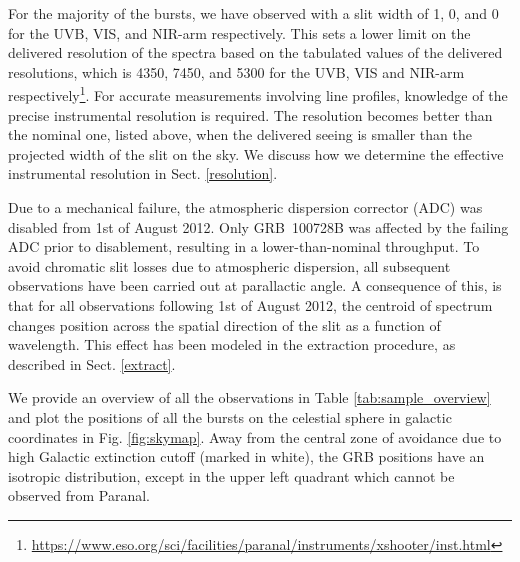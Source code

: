\documentclass{aa}    %
\begin{document}
For the majority of the bursts, we have observed with a slit width of 1,
0, and 0 for the UVB, VIS, and NIR-arm respectively. This sets a
lower limit on the delivered resolution of the spectra based on the tabulated
values of the delivered resolutions, which is 4350, 7450, and 5300 for the UVB,
VIS and NIR-arm
respectively\footnote{\url{https://www.eso.org/sci/facilities/paranal/instruments/xshooter/inst.html}}. %
For accurate measurements involving line profiles, knowledge of the precise
instrumental resolution is required. The resolution becomes better than the
nominal one, listed above, when the delivered seeing is smaller than the
projected width of the slit on the sky. We discuss how we determine the
effective instrumental resolution in Sect. \ref{resolution}.

Due to a mechanical failure, the atmospheric dispersion corrector (ADC) was
disabled from 1st of August 2012. Only GRB~100728B was affected by the failing
ADC prior to disablement, resulting in a lower-than-nominal throughput. To avoid
chromatic slit losses due to atmospheric dispersion, all subsequent observations
have been carried out at parallactic angle. A consequence of this, is that for
all observations following 1st of August 2012, the centroid of spectrum changes
position across the spatial direction of the slit as a function of wavelength.
This effect has been modeled in the extraction procedure, as described in Sect. 
\ref{extract}.



We provide an overview of all the observations in Table
\ref{tab:sample_overview} and plot the positions of all the bursts on the
celestial sphere in galactic coordinates in Fig. \ref{fig:skymap}. Away from the
central zone of avoidance due to high Galactic extinction cutoff (marked in
white), the GRB positions have an isotropic distribution, except in the upper
left quadrant which cannot be observed from Paranal.
\end{document}
